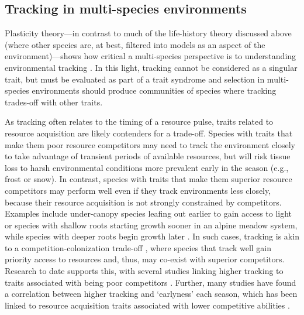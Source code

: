 \documentclass[11pt,letterpaper]{article}
\newcommand{\R}[1]{\label{#1}\linelabel{#1}}
\begin{document}
\subsection{Tracking in multi-species environments} %
\R{sectionmutisppstart} Plasticity theory---in contrast to much of the life-history theory discussed above (where other species are, at best, filtered into models as an aspect of the environment)---shows how critical a multi-species perspective is to understanding environmental tracking \citep{metcalf2015}. In this light, tracking cannot be considered as a singular trait, but must be evaluated as part of a trait syndrome \citep[or mosaic of traits,][]{Ghalambor2007} and selection in multi-species environments should produce communities of species where tracking trades-off with other traits. 

As tracking often relates to the timing of a resource pulse, traits related to resource acquisition are likely contenders for a trade-off. Species with traits that make them poor resource competitors may need to track the environment closely to take advantage of transient periods of available resources, but will risk tissue loss to harsh environmental conditions more prevalent early in the season (e.g., frost or snow). In contrast, species with traits that make them superior resource competitors may perform well even if they track environments less closely, because their resource acquisition is not strongly constrained by competitors. Examples include under-canopy species leafing out earlier to gain access to light \citep{heberling2019} or species with shallow roots starting growth sooner in an alpine meadow system, while species with deeper roots begin growth later \citep{Zhu2016BioLetters}. In such cases, tracking is akin to a competition-colonization trade-off \citep{Amarasekare:2003tq}, where species that track well gain priority access to resources and, thus, may co-exist with superior competitors. Research to date supports this, with several studies linking higher tracking to traits associated with being poor competitors \citep{Dorji2013,lasky2016,Zhu2016BioLetters}. Further, many studies have found a correlation between higher tracking and `earlyness' each season, which has been linked to resource acquisition traits associated with lower competitive abilities \citep[][see Box `Trait trade-offs with tracking']{wolkovich2014aob}. 
\end{document}
